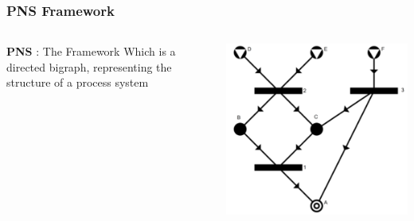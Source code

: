 \documentclass[12pt]{beamer}
\begin{document}
\begin{frame}
\frametitle{PNS Framework} 

\begin{columns}
	

	 \begin{center}\textbf{PNS} :
	The Framework Which is a directed bigraph, representing 
		the structure of a process system
	\end{center}
	\includegraphics[scale=0.3]{pns.png}
	
\end{columns}

\end{frame}
\end{document}
